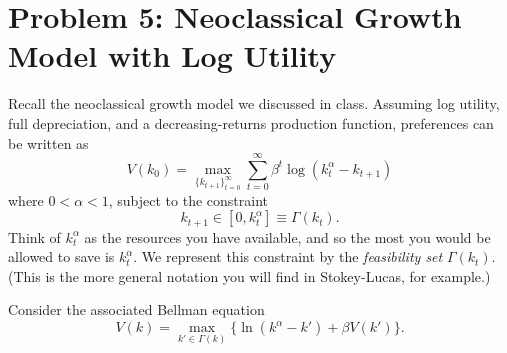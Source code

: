\documentclass[11pt]{extarticle}
\theoremstyle{plain}
\theoremstyle{definition}
\begin{document}
\vspace{5mm}
\section*{Problem 5: Neoclassical Growth Model with Log Utility}

Recall the neoclassical growth model we discussed in class. Assuming log utility, full depreciation, and a decreasing-returns production function, preferences can be written as
\begin{equation*}
	V(k_0) = \max_{ \{ k_{t+1} \}_{t=0}^\infty} \sum_{t=0}^\infty \beta^t \log (k_t^\alpha - k_{t+1})
\end{equation*}
where $0 < \alpha < 1$, subject to the constraint
\begin{equation*}
	k_{t+1} \in [0, k_t^\alpha] \equiv \Gamma(k_t).
\end{equation*}
Think of $k_t^\alpha$ as the resources you have available, and so the most you would be allowed to save is $k_t^\alpha$. We represent this constraint by the \textit{feasibility set} $\Gamma(k_t)$. (This is the more general notation you will find in Stokey-Lucas, for example.)

Consider the associated Bellman equation 
\begin{equation*}
	V(k) = \max_{k' \in \Gamma(k)} \bigg\{ \ln (k^\alpha - k') + \beta V(k') \bigg\}.
\end{equation*}
\end{document}
